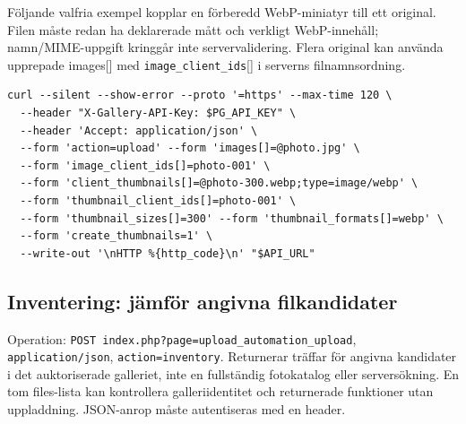 \documentclass[11pt,a4paper]{article}
\newcommand{\codeword}[1]{\nolinkurl{#1}}
\begin{document}
Följande valfria exempel kopplar en förberedd WebP-miniatyr till ett original. Filen måste
redan ha deklarerade mått och verkligt WebP-innehåll; namn/MIME-uppgift kringgår inte
servervalidering. Flera original kan använda upprepade images[] med
\codeword{image_client_ids}[] i serverns filnamnsordning.

\begin{lstlisting}[language={}]
curl --silent --show-error --proto '=https' --max-time 120 \
  --header "X-Gallery-API-Key: $PG_API_KEY" \
  --header 'Accept: application/json' \
  --form 'action=upload' --form 'images[]=@photo.jpg' \
  --form 'image_client_ids[]=photo-001' \
  --form 'client_thumbnails[]=@photo-300.webp;type=image/webp' \
  --form 'thumbnail_client_ids[]=photo-001' \
  --form 'thumbnail_sizes[]=300' --form 'thumbnail_formats[]=webp' \
  --form 'create_thumbnails=1' \
  --write-out '\nHTTP %{http_code}\n' "$API_URL"
\end{lstlisting}

\subsection{\texorpdfstring{Inventering: jämför angivna filkandidater}{Inventering: jämför angivna filkandidater}}

\label{api352:inventory}

Operation: \codeword{POST index.php?page=upload_automation_upload},
\codeword{application/json}, \codeword{action=inventory}. Returnerar träffar för angivna
kandidater i det auktoriserade galleriet, inte en fullständig fotokatalog eller
serversökning. En tom files-lista kan kontrollera galleriidentitet och returnerade
funktioner utan uppladdning. JSON-anrop måste autentiseras med en header.
\end{document}
